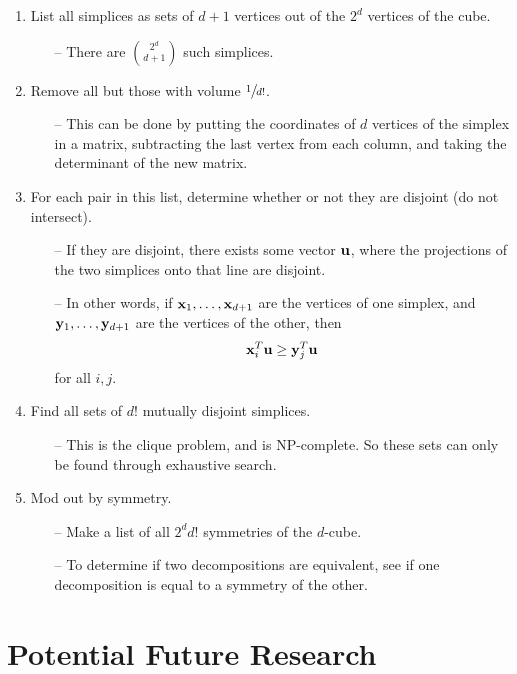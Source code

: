 \documentclass[12pt]{scrippsposter}
\begin{document}
\begin{poster}
\begin{enumerate}[{\bf Step 1.}]
\item List all simplices as sets of $d+1$ vertices out of the $2^d$ vertices of the cube.
	\begin{itemize}
	\item[--] There are ${ 2^d \choose d+1}$ such simplices.
	\end{itemize}
\item Remove all but those with volume $\sfrac{1}{d!}$.
	\begin{itemize}
	\item[--] This can be done by putting the coordinates of $d$ vertices of the simplex in a matrix, subtracting the last vertex from each column, and taking the determinant of the new matrix.
	\end{itemize}
\item For each pair in this list, determine whether or not they are disjoint (do not intersect).
	\begin{itemize}
	\item[--] If they are disjoint, there exists some vector ${\bf u}$, where the projections of the two simplices onto that line are disjoint.
	\item[--] In other words, if ${\bf x}_1,\dotsc,{\bf x}_{d+1}$ are the vertices of one simplex, and ${\bf y}_1,\dotsc,{\bf y}_{d+1}$ are the vertices of the other, then 
	\begin{equation}
		{\bf x}_i^T {\bf u} \geq {\bf y}_j^T {\bf u}
	\end{equation}
	for all $i, j$.
	\end{itemize}
\item Find all sets of $d!$ mutually disjoint simplices.
	\begin{itemize}
	\item[--] This is the clique problem, and is NP-complete.  So these sets can only be found through exhaustive search.
	\end{itemize}
\item Mod out by symmetry.
	\begin{itemize}
	\item[--] Make a list of all $2^d d!$ symmetries of the $d$-cube.
	\item[--] To determine if two decompositions are equivalent, see if one decomposition is equal to a symmetry of the other.
	\end{itemize}
\end{enumerate}

\section{Potential Future Research}


\end{poster}
\end{document}

